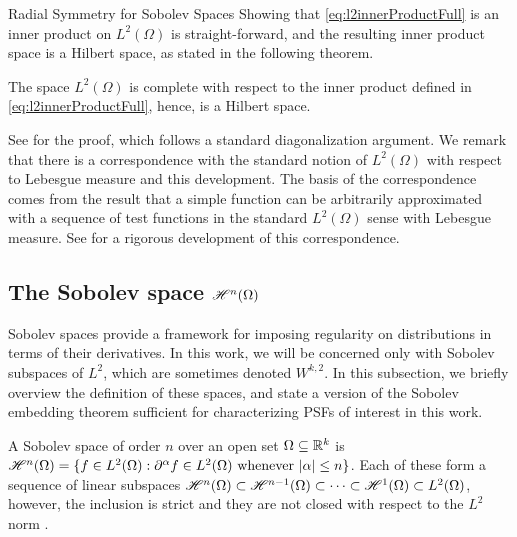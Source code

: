 \begin{chapter}{Radial Symmetry for Sobolev Spaces}
Showing that \eqref{eq:l2innerProductFull} is an inner product on $L^2(\Omega)$ is straight-forward, and the resulting inner product space is a Hilbert space, as stated in the following theorem.
\begin{thm}
The space $L^2(\Omega)$ is complete with respect to the inner product defined in \eqref{eq:l2innerProductFull}, hence, is a Hilbert space.
\end{thm}
See \citep{richtmyer1978principles} for the proof, which follows a standard diagonalization argument. %
We remark that there is a correspondence with the standard notion of $L^2(\Omega)$ with respect to Lebesgue measure and this development.
The basis of the correspondence comes from the result that a simple function can be arbitrarily approximated with a sequence of test functions in the standard $L^2(\Omega)$ sense with Lebesgue measure. 
See \citep{hormander1983} for a rigorous development of this correspondence.
\subsection{The Sobolev space $\mathscr H^n(\Omega)$}
Sobolev spaces provide a framework for imposing regularity on distributions in terms of their derivatives.
In this work, we will be concerned only with Sobolev subspaces of $L^2$, which are sometimes denoted $W^{k,2}$.
In this subsection, we briefly overview the definition of these spaces, and state a version of the Sobolev embedding theorem sufficient for characterizing PSFs of interest in this work.

A Sobolev space of order $n$ over an open set $\Omega \subseteq \mathbb R^k$ is $\mathscr H^n(\Omega) = \{f \in L^2(\Omega): \partial^\alpha f \in L^2(\Omega)\text{ whenever }|\alpha|\le n\}$.
Each of these form a sequence of linear subspaces $\mathscr H^n(\Omega) \subset \mathscr H^{n-1}(\Omega) \subset \dots \subset \mathscr H^1(\Omega) \subset L^2(\Omega)$, however, the inclusion is strict and they are not closed with respect to the $L^2$ norm \citep{richtmyer1978principles}.


\end{chapter}

